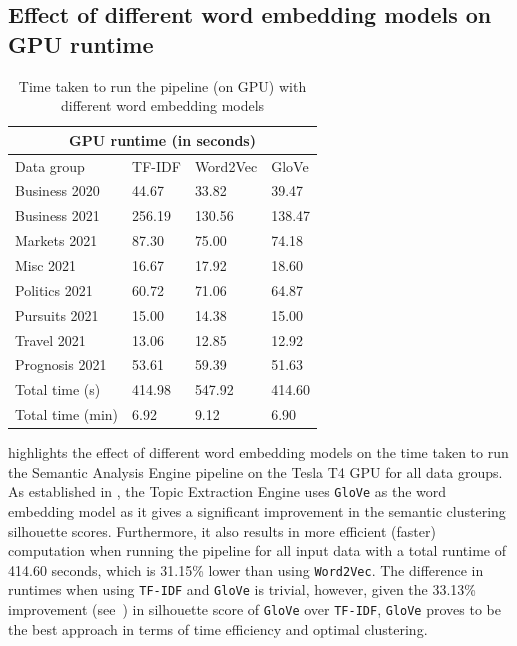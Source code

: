 \subsection{Effect of different word embedding models on GPU runtime}
\vspace{-1ex}
\begin{table}[H]
\centering
\renewcommand{\arraystretch}{1.05}
\begin{tabularx}{0.9\textwidth}{X X X X} 
\multicolumn{4}{c}{GPU runtime (in seconds)} \\
 \hline
 Data group & TF-IDF & Word2Vec & GloVe \\
 \hline
 Business 2020 & 44.67& 33.82& 39.47 \\ 
 Business 2021 & 256.19 & 130.56 & 138.47 \\
 Markets 2021 & 87.30 & 75.00 & 74.18 \\
 Misc 2021 & 16.67 & 17.92 & 18.60 \\
 Politics 2021 & 60.72 & 71.06 & 64.87 \\
 Pursuits 2021 & 15.00 & 14.38 & 15.00 \\ 
 Travel 2021 & 13.06 & 12.85 & 12.92 \\
 Prognosis 2021 & 53.61 & 59.39 & 51.63 \\ 
 \hline
 Total time (s) & 414.98 & 547.92 & 414.60 \\ 
  Total time (min) & 6.92 & 9.12 & 6.90 \\ 
\end{tabularx}
\caption{Time taken to run the pipeline (on GPU) with different word embedding models}
\label{table:word_embed_time}
\end{table}

\vspace{-3ex}
 highlights the effect of different word embedding models on the time taken to run the Semantic Analysis Engine pipeline on the Tesla T4 GPU for all data groups. As established in , the Topic Extraction Engine uses \texttt{GloVe} as the word embedding model as it gives a significant improvement in the semantic clustering silhouette scores. Furthermore, it also results in more efficient (faster) computation when running the pipeline for all input data with a total runtime of 414.60 seconds, which is 31.15\% lower than using \texttt{Word2Vec}. The difference in runtimes when using \texttt{TF-IDF} and \texttt{GloVe} is trivial, however, given the 33.13\% improvement (see~) in silhouette score of \texttt{GloVe} over \texttt{TF-IDF}, \texttt{GloVe} proves to be the best approach in terms of time efficiency and optimal clustering. 

